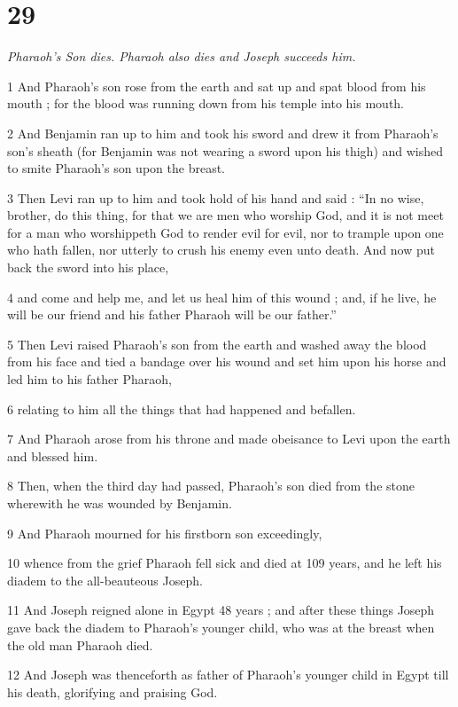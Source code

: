 \chapter{29}

\par \textit{Pharaoh's Son dies. Pharaoh also dies and Joseph succeeds him.}

1 And Pharaoh's son rose from the earth and sat up and spat blood from his mouth ; for the blood was running down from his temple into his mouth. 

2 And Benjamin ran up to him and took his sword and drew it from Pharaoh's son's sheath (for Benjamin was not wearing a sword upon his thigh) and wished to smite Pharaoh's son upon the breast. 

3 Then Levi ran up to him and took hold of his hand and said : “In no wise, brother, do this thing, for that we are men who worship God, and it is not meet for a man who worshippeth God to render evil for evil, nor to trample upon one who hath fallen, nor utterly to crush his enemy even unto death. And now put back the sword into his place, 

4 and come and help me, and let us heal him of this wound ; and, if he live, he will be our friend and his father Pharaoh will be our father.” 

5 Then Levi raised Pharaoh's son from the earth and washed away the blood from his face and tied a bandage over his wound and set him upon his horse and led him to his father Pharaoh, 

6 relating to him all the things that had happened and befallen. 

7 And Pharaoh arose from his throne and made obeisance to Levi upon the earth and blessed him. 

8 Then, when the third day had passed, Pharaoh's son died from the stone wherewith he was wounded by Benjamin. 

9 And Pharaoh mourned for his firstborn son exceedingly, 

10 whence from the grief Pharaoh fell sick and died at 109 years, and he left his diadem to the all-beauteous Joseph. 

11 And Joseph reigned alone in Egypt 48 years ; and after these things Joseph gave back the diadem to Pharaoh's younger child, who was at the breast when the old man Pharaoh died. 

12 And Joseph was thenceforth as father of Pharaoh's younger child in Egypt till his death, glorifying and praising God.


